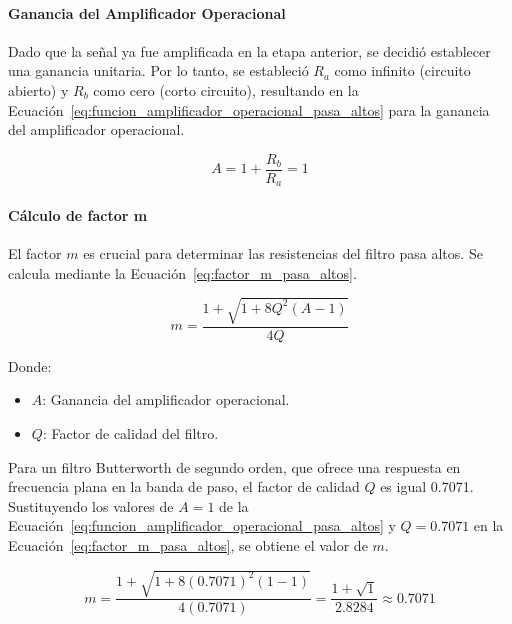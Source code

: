             \paragraph{Ganancia del Amplificador Operacional}
            Dado que la señal ya fue amplificada en la etapa anterior, se decidió establecer una ganancia unitaria. Por lo tanto, se estableció $R_a$ como infinito (circuito abierto) y $R_b$ como cero (corto circuito), resultando en la Ecuación~\ref{eq:funcion_amplificador_operacional_pasa_altos} para la ganancia del amplificador operacional.

            \begin{equation}
                \label{eq:funcion_amplificador_operacional_pasa_altos}
                A = 1 + \frac{R_b}{R_a} = 1
            \end{equation}

            \paragraph{Cálculo de factor m}
            El factor $m$ es crucial para determinar las resistencias del filtro pasa altos. Se calcula mediante la Ecuación~\ref{eq:factor_m_pasa_altos}.

            \begin{equation}
                \label{eq:factor_m_pasa_altos}
                m = \frac{1+\sqrt{1+8Q^2(A-1)}}{4Q}
            \end{equation}

            Donde:
            \begin{itemize}
                \item $A$: Ganancia del amplificador operacional.
                \item $Q$: Factor de calidad del filtro.
            \end{itemize}

            Para un filtro Butterworth de segundo orden, que ofrece una respuesta en frecuencia plana en la banda de paso, el factor de calidad $Q$ es igual 0.7071. Sustituyendo los valores de $A = 1$ de la Ecuación~\ref{eq:funcion_amplificador_operacional_pasa_altos} y $Q = 0.7071$ en la Ecuación~\ref{eq:factor_m_pasa_altos}, se obtiene el valor de $m$.

            \begin{equation}
                \label{eq:factor_m_pasa_altos_valor}
                m = \frac{1+\sqrt{1+8(0.7071)^2(1-1)}}{4(0.7071)} = \frac{1 + \sqrt{1}}{2.8284}\approx 0.7071
            \end{equation}


